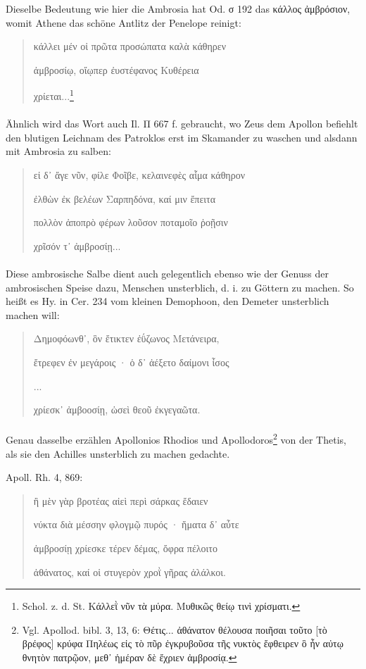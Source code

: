 \documentclass[a4paper, 11pt, oneside]{article}
\begin{document}
Dieselbe Bedeutung wie hier die Ambrosia hat Od. σ 192 das κάλλος ἀμβρόσιον, womit Athene das schöne Antlitz der Penelope reinigt:
\begin{quotation}\large
κάλλει μέν οἰ πρῶτα προσώπατα καλὰ κάθηρεν

ἀμβροσίῳ, οἴῳπερ ἐυστέφανος Κυθέρεια

χρίεται...\footnote{Schol. z. d. St. Κάλλεῒ νῦν τὰ μύρα. Μυθικῶς θείῳ τινὶ χρίσματι.}
\end{quotation}
\paragraph{}
Ähnlich wird das Wort auch Il. Π 667 f. gebraucht, wo Zeus dem Apollon befiehlt den blutigen Leichnam des Patroklos erst im Skamander zu waschen und alsdann mit Ambrosia zu salben:
\begin{quotation}\large
εἰ δ᾽ ἄγε νῦν, φίλε Φοῖβε, κελαινεφὲς αἷμα κάθηρον

ἐλθὼν ἐκ βελέων Σαρπηδόνα, καί μιν ἔπειτα

πολλὸν ἀποπρὸ φέρων λοῦσον ποταμοῖο ῥοῇσιν

χρῖσόν τ᾽ ἀμβροσίῃ...
\end{quotation}
\paragraph{}
Diese ambrosische Salbe dient auch gelegentlich ebenso wie der Genuss der ambrosischen Speise dazu, Menschen unsterblich, d. i. zu Göttern zu machen. So heißt es Hy. in Cer. 234 vom kleinen Demophoon, den Demeter unsterblich machen will:
\begin{quotation}\large
Δημοφόωνθ᾽, ὃν ἔτικτεν ἐΰζωνος Μετάνειρα,

ἔτρεφεν ἐν μεγάροις · ὁ δ᾽ ἀέξετο δαίμονι ἶσος

...

χρίεσκ᾽ ἀμβοοσίῃ, ὡσεὶ θεοῦ ἐκγεγαῶτα.
\end{quotation}
\paragraph{}
Genau dasselbe erzählen Apollonios Rhodios und Apollodoros\footnote{Vgl. Apollod. bibl. 3, 13, 6: Θέτις... ἀθάνατον θέλουσα ποιῆσαι τοῦτο [τὸ βρέφος] κρύφα Πηλέως εἰς τὸ πῦρ ἐγκρυβοῦσα τῆς νυκτὸς ἔφθειρεν ὃ ἦν αὐτῳ θνητὸν πατρῷον, μεθ᾽ ἡμέραν δὲ ἔχριεν ἀμβροσίᾳ.} von der Thetis, als sie den Achilles unsterblich zu machen gedachte.

Apoll. Rh. 4, 869:
\begin{quotation}\large
ἢ μὲν γὰρ βροτέας αἰεὶ περὶ σάρκας ἔδαιεν

νύκτα διὰ μέσσην φλογμῷ πυρός · ἥματα δ᾽ αὖτε

ἀμβροσίῃ χρίεσκε τέρεν δέμας, ὄφρα πέλοιτο

ἀθάνατος, καί οἱ στυγερὸν χροῒ γῆρας ἀλάλκοι.
\end{quotation}
\end{document}
